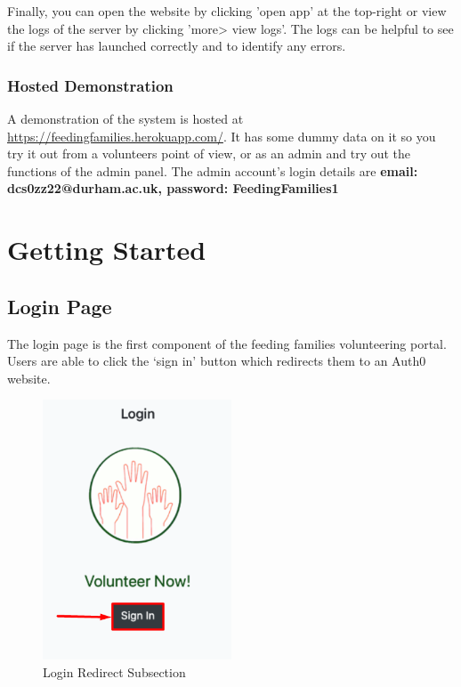 \documentclass[12pt]{article}
\begin{document}
\noindent
Finally, you can open the website by clicking 'open app' at the top-right or view the logs of the server by clicking 'more> view logs'. The logs can be helpful to see if the server has launched correctly and to identify any errors.


\subsubsection{Hosted Demonstration}
A demonstration of the system is hosted at \href{https://feedingfamilies.herokuapp.com/}{https://feedingfamilies.herokuapp.com/}. It has some dummy data on it so you try it out from a volunteers point of view, or as an admin and try out the functions of the admin panel. The admin account's login details are \textbf{email: dcs0zz22@durham.ac.uk, password: FeedingFamilies1}

\newpage
\section{Getting Started} %

\subsection{Login Page}

The login page is the first component of the feeding families volunteering portal. Users are able to click the ‘sign in’ button which redirects them to an Auth0 website. 

\begin{figure}[h]
    \centering
    \includegraphics[width=0.5\textwidth]{main/login.png}
    \caption{Login Redirect Subsection}
    \label{fig1}
\end{figure}
\end{document}
